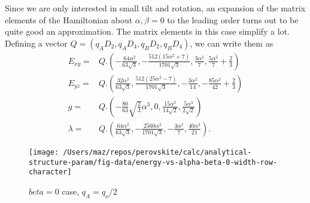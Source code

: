 \documentclass[a4paper,prb,twocolumn]{revtex4-1}  %
\begin{document}
Since we are only interested in small tilt and rotation,
an expansion of the matrix elements of the Hamiltonian about 
${\alpha,\beta=0}$
to the leading order turns out to be quite good an approximation.
The matrix elements in this case simplify a lot.
Defining a vector ${Q = \left( q_A D_2, q_A D_4, q_B D_2,q_B D_4  \right)}$,
 we can write them as
\begin{align}
E_{xy}=& Q.
\left(-\frac{64 \alpha ^2}{63 \sqrt{3}},-\frac{512 \left(15 \alpha ^2+7\right)}{1701 \sqrt{3}},\frac{3\alpha ^2}{7} ,\frac{5 \alpha ^2}{7}+\frac{2}{3}\right)\\
E_{yz}=& Q.
\left(\frac{32 \alpha ^2}{63 \sqrt{3}},\frac{512 \left(25 \alpha ^2-7\right)}{1701 \sqrt{3}},-\frac{3 \alpha ^2}{14},-\frac{85 \alpha ^2}{42}+\frac{2}{3}\right)\\
g=& Q.
\left(-\frac{80}{63} \sqrt{\frac{2}{3}} \alpha ^3,0,\frac{15 \alpha ^3}{14 \sqrt{2}},\frac{5 \alpha ^3}{2 \sqrt{2}}\right)\\
\lambda=& Q.
\left(\frac{64 \alpha ^2}{63 \sqrt{3}},-\frac{2560 \alpha ^2}{1701 \sqrt{3}},-\frac{3 \alpha ^2}{7},\frac{40 \alpha ^2}{21}\right).
\end{align}





\begin{figure}[htbp]
\begin{center}
\texttt{[image: /Users/maz/repos/perovskite/calc/analytical-structure-param/fig-data/energy-vs-alpha-beta-0-width-row-character]}
\caption{$beta=0$ case, $q_A=q_o/2$}
\label{fig:t2g-beta0}
\end{center}
\end{figure}
\end{document}
